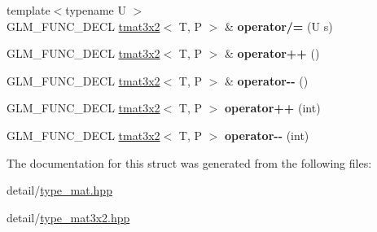 \begin{DoxyCompactItemize}
\item 
\hypertarget{structglm_1_1tmat3x2_a824a792e163b060114a4df6f1de292a9}{{\footnotesize template$<$typename U $>$ }\\G\-L\-M\-\_\-\-F\-U\-N\-C\-\_\-\-D\-E\-C\-L \hyperlink{structglm_1_1tmat3x2}{tmat3x2}$<$ T, P $>$ \& {\bfseries operator/=} (U s)}\label{structglm_1_1tmat3x2_a824a792e163b060114a4df6f1de292a9}

\item 
\hypertarget{structglm_1_1tmat3x2_a39240e7a82f3a38b61ce78e7e720c546}{G\-L\-M\-\_\-\-F\-U\-N\-C\-\_\-\-D\-E\-C\-L \hyperlink{structglm_1_1tmat3x2}{tmat3x2}$<$ T, P $>$ \& {\bfseries operator++} ()}\label{structglm_1_1tmat3x2_a39240e7a82f3a38b61ce78e7e720c546}

\item 
\hypertarget{structglm_1_1tmat3x2_afc48f7d17839a82bb8fb824a76d3de84}{G\-L\-M\-\_\-\-F\-U\-N\-C\-\_\-\-D\-E\-C\-L \hyperlink{structglm_1_1tmat3x2}{tmat3x2}$<$ T, P $>$ \& {\bfseries operator-\/-\/} ()}\label{structglm_1_1tmat3x2_afc48f7d17839a82bb8fb824a76d3de84}

\item 
\hypertarget{structglm_1_1tmat3x2_a43e925169a9137fe2ebddbbd763f3a09}{G\-L\-M\-\_\-\-F\-U\-N\-C\-\_\-\-D\-E\-C\-L \hyperlink{structglm_1_1tmat3x2}{tmat3x2}$<$ T, P $>$ {\bfseries operator++} (int)}\label{structglm_1_1tmat3x2_a43e925169a9137fe2ebddbbd763f3a09}

\item 
\hypertarget{structglm_1_1tmat3x2_a167ab5d068d1edb840f9375bf4c412e9}{G\-L\-M\-\_\-\-F\-U\-N\-C\-\_\-\-D\-E\-C\-L \hyperlink{structglm_1_1tmat3x2}{tmat3x2}$<$ T, P $>$ {\bfseries operator-\/-\/} (int)}\label{structglm_1_1tmat3x2_a167ab5d068d1edb840f9375bf4c412e9}

\end{DoxyCompactItemize}


The documentation for this struct was generated from the following files\-:\begin{DoxyCompactItemize}
\item 
detail/\hyperlink{type__mat_8hpp}{type\-\_\-mat.\-hpp}\item 
detail/\hyperlink{type__mat3x2_8hpp}{type\-\_\-mat3x2.\-hpp}\end{DoxyCompactItemize}
